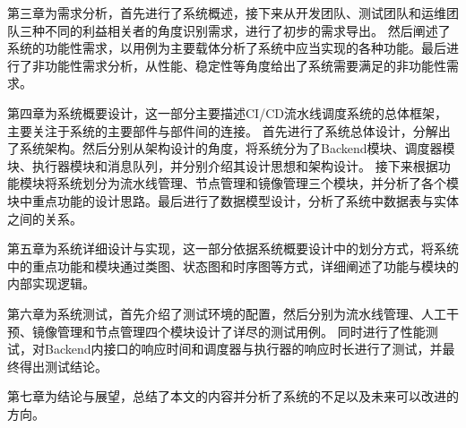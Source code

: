 第三章为需求分析，首先进行了系统概述，接下来从开发团队、测试团队和运维团队三种不同的利益相关者的角度识别需求，进行了初步的需求导出。
然后阐述了系统的功能性需求，以用例为主要载体分析了系统中应当实现的各种功能。最后进行了非功能性需求分析，从性能、稳定性等角度给出了系统需要满足的非功能性需求。

第四章为系统概要设计，这一部分主要描述CI/CD流水线调度系统的总体框架，主要关注于系统的主要部件与部件间的连接。
首先进行了系统总体设计，分解出了系统架构。然后分别从架构设计的角度，将系统分为了Backend模块、调度器模块、执行器模块和消息队列，并分别介绍其设计思想和架构设计。
接下来根据功能模块将系统划分为流水线管理、节点管理和镜像管理三个模块，并分析了各个模块中重点功能的设计思路。最后进行了数据模型设计，分析了系统中数据表与实体之间的关系。

第五章为系统详细设计与实现，这一部分依据系统概要设计中的划分方式，将系统中的重点功能和模块通过类图、状态图和时序图等方式，详细阐述了功能与模块的内部实现逻辑。

第六章为系统测试，首先介绍了测试环境的配置，然后分别为流水线管理、人工干预、镜像管理和节点管理四个模块设计了详尽的测试用例。
同时进行了性能测试，对Backend内接口的响应时间和调度器与执行器的响应时长进行了测试，并最终得出测试结论。

第七章为结论与展望，总结了本文的内容并分析了系统的不足以及未来可以改进的方向。